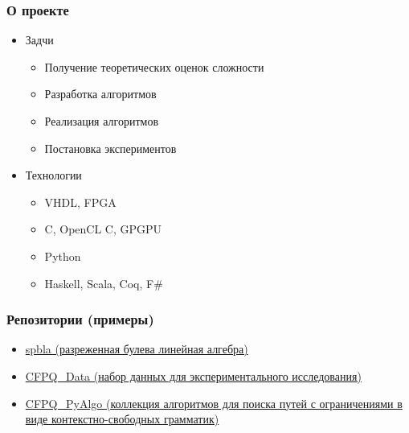 \documentclass[xcolor=table,aspectratio=169]{beamer}
\begin{document}
\begin{frame}[fragile]
\frametitle{О проекте}
\begin{itemize}

      \item Задчи
      \begin{itemize}
        \item Получение теоретических оценок сложности        
        \item Разработка алгоритмов
        \item Реализация алгоритмов
        \item Постановка экспериментов        
      \end{itemize}
      \pause
      \item Технологии
      \begin{itemize}
        \item VHDL, FPGA
        \item C, OpenCL C, GPGPU
        \item Python
        \item Haskell, Scala, Coq, F\#
      \end{itemize}
\end{itemize}    
\end{frame}


\begin{frame}[fragile]

  \frametitle{Репозитории (примеры)}
  \begin{itemize}

      \item \href{https://github.com/JetBrains-Research/spbla}{spbla (разреженная булева линейная алгебра)}
      \item \href{https://github.com/JetBrains-Research/cfpq_data}{CFPQ\_Data (набор данных для экспериментального исследования)}
      \item \href{https://github.com/JetBrains-Research/cfpq_pyalgo}{CFPQ\_PyAlgo (коллекция алгоритмов для поиска путей с ограничениями в виде контекстно-свободных грамматик)}
      
  \end{itemize}
\end{frame}
\end{document}
